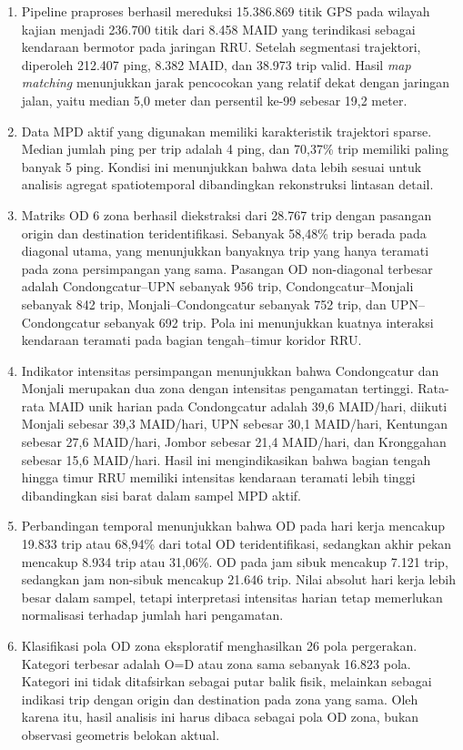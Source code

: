 \begin{enumerate}
    \item Pipeline praproses berhasil mereduksi 15.386.869 titik GPS pada wilayah kajian menjadi 236.700 titik dari 8.458 MAID yang terindikasi sebagai kendaraan bermotor pada jaringan RRU. Setelah segmentasi trajektori, diperoleh 212.407 ping, 8.382 MAID, dan 38.973 trip valid. Hasil \textit{map matching} menunjukkan jarak pencocokan yang relatif dekat dengan jaringan jalan, yaitu median 5,0 meter dan persentil ke-99 sebesar 19,2 meter.
    
    \item Data MPD aktif yang digunakan memiliki karakteristik trajektori sparse. Median jumlah ping per trip adalah 4 ping, dan 70,37\% trip memiliki paling banyak 5 ping. Kondisi ini menunjukkan bahwa data lebih sesuai untuk analisis agregat spatiotemporal dibandingkan rekonstruksi lintasan detail.
    
    \item Matriks OD 6 zona berhasil diekstraksi dari 28.767 trip dengan pasangan origin dan destination teridentifikasi. Sebanyak 58,48\% trip berada pada diagonal utama, yang menunjukkan banyaknya trip yang hanya teramati pada zona persimpangan yang sama. Pasangan OD non-diagonal terbesar adalah Condongcatur--UPN sebanyak 956 trip, Condongcatur--Monjali sebanyak 842 trip, Monjali--Condongcatur sebanyak 752 trip, dan UPN--Condongcatur sebanyak 692 trip. Pola ini menunjukkan kuatnya interaksi kendaraan teramati pada bagian tengah--timur koridor RRU.
    
    \item Indikator intensitas persimpangan menunjukkan bahwa Condongcatur dan Monjali merupakan dua zona dengan intensitas pengamatan tertinggi. Rata-rata MAID unik harian pada Condongcatur adalah 39,6 MAID/hari, diikuti Monjali sebesar 39,3 MAID/hari, UPN sebesar 30,1 MAID/hari, Kentungan sebesar 27,6 MAID/hari, Jombor sebesar 21,4 MAID/hari, dan Kronggahan sebesar 15,6 MAID/hari. Hasil ini mengindikasikan bahwa bagian tengah hingga timur RRU memiliki intensitas kendaraan teramati lebih tinggi dibandingkan sisi barat dalam sampel MPD aktif.
    
    \item Perbandingan temporal menunjukkan bahwa OD pada hari kerja mencakup 19.833 trip atau 68,94\% dari total OD teridentifikasi, sedangkan akhir pekan mencakup 8.934 trip atau 31,06\%. OD pada jam sibuk mencakup 7.121 trip, sedangkan jam non-sibuk mencakup 21.646 trip. Nilai absolut hari kerja lebih besar dalam sampel, tetapi interpretasi intensitas harian tetap memerlukan normalisasi terhadap jumlah hari pengamatan.
    
    \item Klasifikasi pola OD zona eksploratif menghasilkan 26 pola pergerakan. Kategori terbesar adalah O=D atau zona sama sebanyak 16.823 pola. Kategori ini tidak ditafsirkan sebagai putar balik fisik, melainkan sebagai indikasi trip dengan origin dan destination pada zona yang sama. Oleh karena itu, hasil analisis ini harus dibaca sebagai pola OD zona, bukan observasi geometris belokan aktual.
\end{enumerate}

